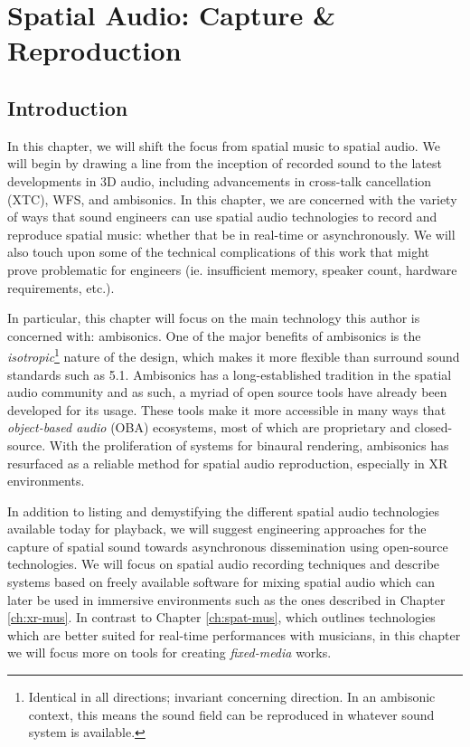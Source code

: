 \chapter{Spatial Audio: Capture \& Reproduction} \label{ch:spat-aud}

\section{Introduction}

In this chapter, we will shift the focus from spatial music to spatial audio. We will begin by drawing a line from the inception of recorded sound to the latest developments in 3D audio, including advancements in cross-talk cancellation (XTC), WFS, and ambisonics. In this chapter, we are concerned with the variety of ways that sound engineers can use spatial audio technologies to record and reproduce spatial music: whether that be in real-time or asynchronously. We will also touch upon some of the technical complications of this work that might prove problematic for engineers (ie. insufficient memory, speaker count, hardware requirements, etc.).

In particular, this chapter will focus on the main technology this author is concerned with: ambisonics. One of the major benefits of ambisonics is the \textit{isotropic}\footnote{Identical in all directions; invariant concerning direction. In an ambisonic context, this means the sound field can be reproduced in whatever sound system is available.} nature of the design, which makes it more flexible than surround sound standards such as 5.1. Ambisonics has a long-established tradition in the spatial audio community and as such, a myriad of open source tools have already been developed for its usage. These tools make it more accessible in many ways that \textit{object-based audio} (OBA) ecosystems, most of which are proprietary and closed-source. With the proliferation of systems for binaural rendering, ambisonics has resurfaced as a reliable method for spatial audio reproduction, especially in XR environments.

In addition to listing and demystifying the different spatial audio technologies available today for playback, we will suggest engineering approaches for the capture of spatial sound towards asynchronous dissemination using open-source technologies. We will focus on spatial audio recording techniques and describe systems based on freely available software for mixing spatial audio which can later be used in immersive environments such as the ones described in Chapter \ref{ch:xr-mus}. In contrast to Chapter \ref{ch:spat-mus}, which outlines technologies which are better suited for real-time performances with musicians, in this chapter we will focus more on tools for creating \textit{fixed-media} works.

